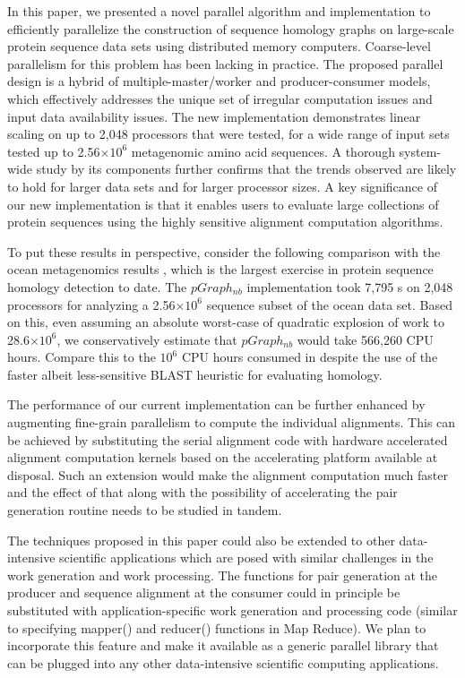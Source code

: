 \documentclass[10pt,journal,letterpaper,compsoc]{IEEEtran}
\begin{document}
In this paper, we presented a novel parallel algorithm and implementation to efficiently parallelize the construction of sequence homology graphs on large-scale protein sequence data sets using distributed memory computers. Coarse-level parallelism for this problem has been lacking in practice. The proposed parallel design is a hybrid of multiple-master/worker and producer-consumer models, which effectively addresses the unique set of irregular computation issues and input data availability issues. The new implementation demonstrates linear scaling on up to 2,048 processors that were tested, for a wide range of input sets tested up to 2.56$\times 10^6$ metagenomic amino acid sequences. A thorough system-wide study by its components further confirms that the trends observed are likely to hold for larger data sets and for larger processor sizes. A key significance of our new implementation is that it enables users to evaluate large collections of protein sequences using the highly sensitive alignment computation algorithms.  

To put these results in perspective, consider the following comparison with the ocean metagenomics results \cite{Yooseph07}, which is the largest exercise in protein sequence homology detection to date. The $pGraph_{nb}$ implementation took 7,795 s on 2,048 processors for analyzing a 2.56$\times 10^6$ sequence subset of the ocean data set. Based on this, even assuming an absolute worst-case of quadratic explosion of work to 28.6$\times 10^6$, we conservatively estimate that $pGraph_{nb}$ would take 566,260 CPU hours. Compare this to the $10^6$ CPU hours consumed in \cite{Yooseph07} despite the use of  the faster albeit less-sensitive BLAST heuristic for evaluating homology.

The performance of our current implementation can be further enhanced by augmenting fine-grain parallelism to compute the individual alignments. This can be achieved by substituting the serial alignment code with hardware accelerated alignment computation kernels based on the accelerating platform available at disposal. Such an extension would make the alignment computation much faster and the effect of that along with the possibility of accelerating the pair generation routine needs to be studied in tandem.

The techniques proposed in this paper could also be extended to other data-intensive scientific applications which are posed with similar challenges in the work generation and work processing. The functions for pair generation at the producer and sequence alignment at the consumer could in principle be substituted with application-specific work generation and processing code (similar to specifying mapper() and reducer() functions in Map Reduce). We plan to incorporate this feature and make it available as a generic parallel library that can be plugged into any other data-intensive scientific computing applications. 
\end{document}
